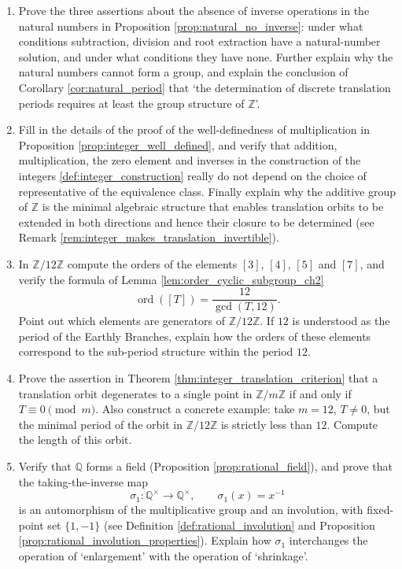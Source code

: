 \begin{enumerate}[leftmargin=3em, label=\textbf{Exercise \arabic*}]
    \item Prove the three assertions about the absence of inverse operations in the natural numbers in Proposition \ref{prop:natural_no_inverse}:
    under what conditions subtraction, division and root extraction have a natural-number solution, and under what conditions they have none.
    Further explain why the natural numbers cannot form a group, and explain the conclusion of Corollary \ref{cor:natural_period}
    that `the determination of discrete translation periods requires at least the group structure of $\mathbb{Z}$'.

    \item Fill in the details of the proof of the well-definedness of multiplication in Proposition \ref{prop:integer_well_defined},
    and verify that addition, multiplication, the zero element and inverses in the construction of the integers \ref{def:integer_construction}
    really do not depend on the choice of representative of the equivalence class. Finally explain why the additive group of
    $\mathbb{Z}$ is the minimal algebraic structure that enables translation orbits to be extended in both directions and hence
    their closure to be determined (see Remark \ref{rem:integer_makes_translation_invertible}).

    \item In $\mathbb{Z}/12\mathbb{Z}$ compute the orders of the elements $[3]$, $[4]$, $[5]$ and $[7]$,
    and verify the formula of Lemma \ref{lem:order_cyclic_subgroup_ch2}
    \[
    \operatorname{ord}([T])=\frac{12}{\gcd(T,12)}.
    \]
    Point out which elements are generators of $\mathbb{Z}/12\mathbb{Z}$.
    If $12$ is understood as the period of the Earthly Branches, explain how the orders of these elements correspond to the sub-period structure within the period $12$.

    \item Prove the assertion in Theorem \ref{thm:integer_translation_criterion} that a translation orbit
    degenerates to a single point in $\mathbb{Z}/m\mathbb{Z}$ if and only if $T\equiv0\pmod m$.
    Also construct a concrete example: take $m=12$, $T\neq0$, but the minimal period of the orbit in $\mathbb{Z}/12\mathbb{Z}$
    is strictly less than $12$. Compute the length of this orbit.

    \item Verify that $\mathbb{Q}$ forms a field (Proposition \ref{prop:rational_field}),
    and prove that the taking-the-inverse map
    \[
    \sigma_1:\mathbb{Q}^{\times}\to\mathbb{Q}^{\times},\qquad
    \sigma_1(x)=x^{-1}
    \]
    is an automorphism of the multiplicative group and an involution, with fixed-point set $\{1,-1\}$
    (see Definition \ref{def:rational_involution} and Proposition \ref{prop:rational_involution_properties}).
    Explain how $\sigma_1$ interchanges the operation of `enlargement' with the operation of `shrinkage'.


\end{enumerate}
